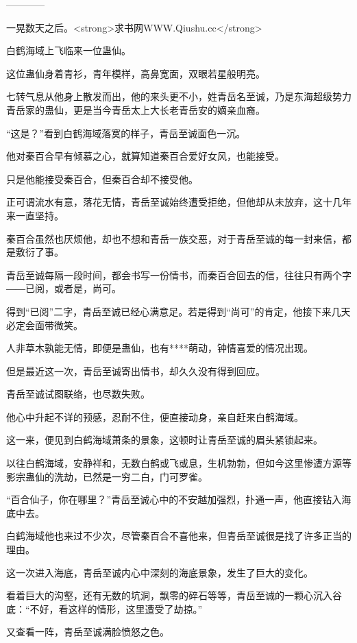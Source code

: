
\begin{this_body}

------------

一晃数天之后。<strong>求书网WWW.Qiushu.cc</strong>

白鹤海域上飞临来一位蛊仙。

这位蛊仙身着青衫，青年模样，高鼻宽面，双眼若星般明亮。

七转气息从他身上散发而出，他的来头更不小，姓青岳名至诚，乃是东海超级势力青岳家的蛊仙，更是当今青岳太上大长老青岳安的嫡亲血裔。

“这是？”看到白鹤海域落寞的样子，青岳至诚面色一沉。

他对秦百合早有倾慕之心，就算知道秦百合爱好女风，也能接受。

只是他能接受秦百合，但秦百合却不接受他。

正可谓流水有意，落花无情，青岳至诚始终遭受拒绝，但他却从未放弃，这十几年来一直坚持。

秦百合虽然也厌烦他，却也不想和青岳一族交恶，对于青岳至诚的每一封来信，都是敷衍了事。

青岳至诚每隔一段时间，都会书写一份情书，而秦百合回去的信，往往只有两个字――已阅，或者是，尚可。

得到“已阅”二字，青岳至诚已经心满意足。若是得到“尚可”的肯定，他接下来几天必定会面带微笑。

人非草木孰能无情，即便是蛊仙，也有****萌动，钟情喜爱的情况出现。

但是最近这一次，青岳至诚寄出情书，却久久没有得到回应。

青岳至诚试图联络，也尽数失败。

他心中升起不详的预感，忍耐不住，便直接动身，亲自赶来白鹤海域。

这一来，便见到白鹤海域萧条的景象，这顿时让青岳至诚的眉头紧锁起来。

以往白鹤海域，安静祥和，无数白鹤或飞或息，生机勃勃，但如今这里惨遭方源等影宗蛊仙的洗劫，已然是一穷二白，门可罗雀。

“百合仙子，你在哪里？”青岳至诚心中的不安越加强烈，扑通一声，他直接钻入海底中去。

白鹤海域他也来过不少次，尽管秦百合不喜他来，但青岳至诚很是找了许多正当的理由。

这一次进入海底，青岳至诚内心中深刻的海底景象，发生了巨大的变化。

看着巨大的沟壑，还有无数的坑洞，飘零的碎石等等，青岳至诚的一颗心沉入谷底：“不好，看这样的情形，这里遭受了劫掠。”

又查看一阵，青岳至诚满脸愤怒之色。


\end{this_body}
